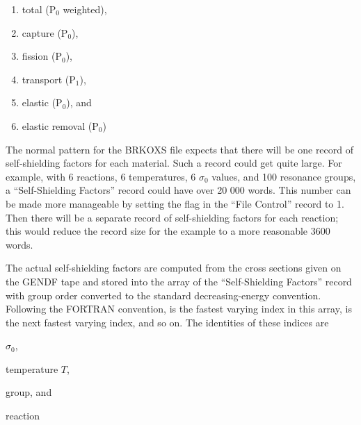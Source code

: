 \begin{singlespace}
\begin{enumerate}
\item total (P$_0$ weighted),
\item capture (P$_0$),
\item fission (P$_0$),
\item transport (P$_1$),
\item elastic (P$_0$), and
\item elastic removal (P$_0$)
\end{enumerate}
\end{singlespace}

The normal pattern for the BRKOXS file expects that there will be
one record of self-shielding factors for each material.  Such a record
could get quite large.  For example, with 6 reactions, 6 temperatures,
6 $\sigma_0$ values, and 100 resonance groups, a ``Self-Shielding Factors''
record could have over 20 000 words.  This number can be made more
manageable by setting the  flag in the ``File Control''
record to 1.  Then there will be a separate record of self-shielding
factors for each reaction; this would reduce the record size for the
example to a more reasonable 3600 words.

The actual self-shielding factors are computed from the cross
sections given on the GENDF tape and stored into the
 array of the ``Self-Shielding Factors''
record with group order converted to the standard decreasing-energy
convention.  Following the FORTRAN convention,  is the fastest
varying index in this array,  is the next fastest varying
index, and so on.  The identities of these indices are

\begin{description}
\begin{singlespace}

\item[\cword{    N}] $\sigma_0$,
\item[\cword{    K}] temperature $T$,
\item[\cword{    J}] group, and
\item[\cword{    M}] reaction

\end{singlespace}
\end{description}

